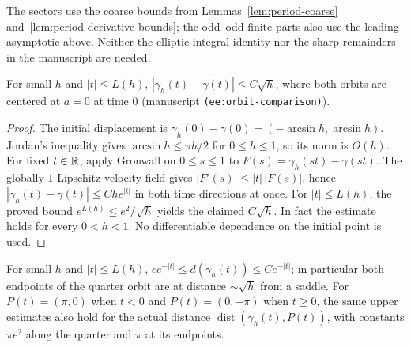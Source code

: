 \begin{remark}
The sectors use the coarse bounds from Lemmas~\ref{lem:period-coarse}
and~\ref{lem:period-derivative-bounds}; the odd--odd finite parts also use
the leading asymptotic above. Neither the elliptic-integral identity nor
the sharp remainders in the manuscript are needed.
\end{remark}

\begin{lemma}
\label{lem:orbit-comparison}
\leanok
For small $h$ and $|t|\le L(h)$, $|\gamma_h(t)-\gamma(t)|\le C\sqrt h$, where both orbits
are centered at $a=0$ at time $0$ (manuscript \texttt{(ee:orbit-comparison)}).
\end{lemma}

\begin{proof}
\leanok
The initial displacement is
$\gamma_h(0)-\gamma(0)=(-\arcsin h,\arcsin h)$.
Jordan's inequality gives $\arcsin h\le\pi h/2$ for $0\le h\le1$,
so its norm is $O(h)$.
For fixed $t\in\mathbb{R}$, apply Gronwall on $0\le s\le1$ to
$F(s)=\gamma_h(st)-\gamma(st)$. The globally $1$-Lipschitz velocity
field gives $|F'(s)|\le|t|\,|F(s)|$, hence
$|\gamma_h(t)-\gamma(t)|\le Ch e^{|t|}$ in both time directions
at once. For $|t|\le L(h)$, the proved bound
$e^{L(h)}\le e^2/\sqrt h$ yields the claimed $C\sqrt h$.
In fact the estimate holds for every $0<h<1$.
No differentiable dependence on the initial point is used.
\end{proof}

\begin{lemma}
\label{lem:orbit-saddle-distance}
\leanok
For small $h$ and $|t|\le L(h)$, $ce^{-|t|}\le d(\gamma_h(t))\le Ce^{-|t|}$; in particular
both endpoints of the quarter orbit are at distance $\sim\sqrt h$ from a saddle.
For $P(t)=(\pi,0)$ when $t<0$ and $P(t)=(0,-\pi)$ when $t\ge0$,
the same upper estimates also hold for the actual distance
$\operatorname{dist}(\gamma_h(t),P(t))$, with constants $\pi e^2$ along
the quarter and $\pi$ at its endpoints.
\end{lemma}

